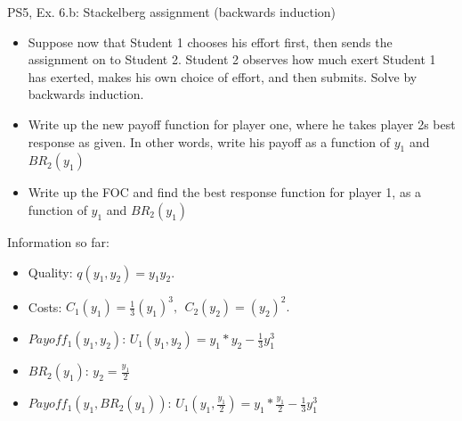 \begin{frame}{PS5, Ex. 6.b: Stackelberg assignment (backwards induction)}
    \begin{itemize}
    \item[(b)] Suppose now that Student 1 chooses his effort first, then sends the assignment on to Student 2. Student 2 observes how much exert Student 1 has exerted, makes his own choice of effort, and then submits. Solve by backwards induction.
    \end{itemize}
    \vfill\null
  \begin{multicols}{2}
    \begin{itemize}
      \item[(Step 1)] Write up the new payoff function for player one, where he takes player 2s best response as given. In other words, write his payoff as a function of \begin{math}y_1\end{math} and \begin{math}BR_2(y_1)\end{math}
      \item[(Step 2)] Write up the FOC and find the best response function for player 1, as a function of \begin{math}y_1\end{math} and \begin{math}BR_2(y_1)\end{math}
    \end{itemize}
    \vfill\null \columnbreak
    Information so far:
    \begin{itemize}
        \item[1] Quality: $q(y_1, y_2) = y_1y_2.$\\
        \item[2] Costs: $C_1(y_1) = \frac{1}{3}(y_1)^3,\ \ C_2(y_2) = (y_2)^2.$\\
        \item[3] $Payoff_1(y_1,y_2)$: $U_1(y_1,y_2) = y_1*y_2-\frac{1}{3}y_1^3$ \\
        \item[4] $BR_2(y_1)$: $y_2 = \frac{y_1}{2}$ \\
        \item[5] $Payoff_1(y_1,BR_2(y_1))$: $U_1(y_1,\frac{y_1}{2}) = y_1*\frac{y_1}{2}-\frac{1}{3}y_1^3$ \\
    \end{itemize}
    \vfill\null
  \end{multicols}
\end{frame}

